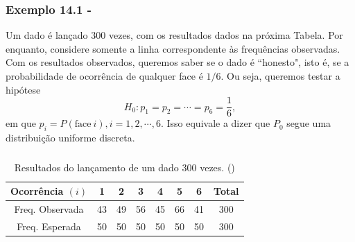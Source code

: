 \documentclass[14pt,aspectratio=1610]{beamer}
\newcommand{\Ho}{\ensuremath{H_{0}}}
\begin{document}
\begin{frame}{}
\frametitle{Exemplo 14.1 - \cite{Morettin09}}
\begin{block}{}
\justifying
Um dado é lançado $300$ vezes, com os resultados dados na próxima Tabela. Por enquanto, considere somente a linha correspondente às frequências observadas. Com os resultados observados, queremos saber se o dado é ``honesto", isto é, se a probabilidade
de ocorrência de qualquer face é $1/6.$ Ou seja, queremos testar a hipótese
$$\Ho: p_{1} = p_{2} = \cdots = p_{6} = \dfrac{1}{6},$$
em que $p_{i} = P(\textrm{face}\ i), i = 1, 2,\cdots, 6.$ Isso equivale a dizer que $P_{0}$ segue uma distribuição uniforme discreta.

\end{block}
\end{frame}

\begin{frame}{}
\frametitle{}
\begin{block}{}
\justifying
\begin{table}[]
\caption{Resultados do lançamento de um dado 300 vezes. (\cite{Morettin09})}
\begin{tabular}{c|cccccc|c}
\hline
Ocorrência $(i)$&1 &2 &3 &4 &5 &6 &Total\\
\hline
Freq. Observada &43&49&56&45&66&41&300\\
Freq. Esperada  &50&50&50&50&50&50&300\\
\hline
\end{tabular}
\end{table}
\end{block}
\end{frame}
\end{document}
